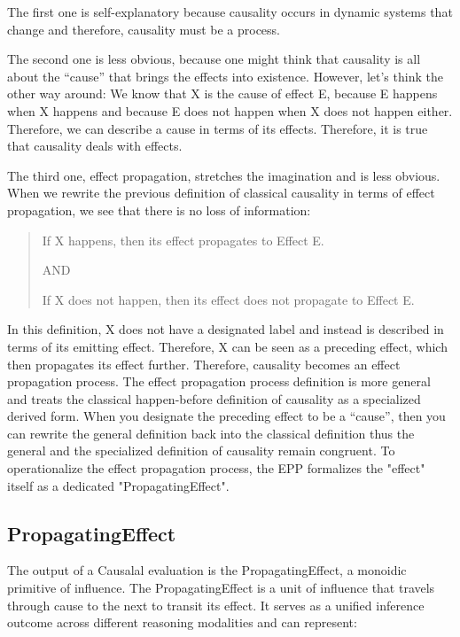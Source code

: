 The first one is self-explanatory because causality occurs in dynamic systems that change and therefore, causality must be a process.

The second one is less obvious, because one might think that causality is all about the “cause” that brings the effects into existence. However, let’s think the other way around: We know that X is the cause of effect E, because E happens when X happens and because E does not happen when X does not happen either. Therefore, we can describe a cause in terms of its effects. Therefore, it is true that causality deals with effects.

The third one, effect propagation, stretches the imagination and is less obvious. When we rewrite the previous definition of classical causality in terms of effect propagation, we see that there is no loss of information:

\begin{quote}
    If X happens, then its effect propagates to Effect E.

    AND
    
    If X does not happen, then its effect does not propagate to Effect E.
\end{quote}

In this definition, X does not have a designated label and instead is described in terms of its emitting effect. Therefore, X can be seen as a preceding effect, which then propagates its effect further. Therefore, causality becomes an effect propagation process. The effect propagation process definition is more general and treats the classical happen-before definition of causality as a specialized derived form. When you designate the preceding effect to be a “cause”, then you can rewrite the general definition back into the classical definition thus the general and the specialized definition of causality remain congruent. To operationalize the effect propagation process, the EPP formalizes the "effect" itself as a dedicated "PropagatingEffect".


\subsection{PropagatingEffect}
\label{sec:propagating_effect}

The output of a Causalal evaluation is the PropagatingEffect, a monoidic primitive of influence. The PropagatingEffect is a unit of influence that travels through cause to the next to transit its effect.  
It serves as a unified inference outcome across different reasoning modalities and can represent:

